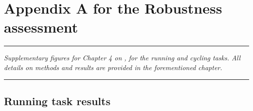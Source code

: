 
\appendix
\renewcommand\chaptername{Appendix~}

\lhead[\fancyplain{}{\leftmark}]%
      {\fancyplain{}{}} %
\chead[\fancyplain{}{}]%
      {\fancyplain{}{}}
\rhead[\fancyplain{}{}]%
      {\fancyplain{}{\rightmark}}%
\lfoot[\fancyplain{}{}]%
      {\fancyplain{}{}}
\cfoot[\fancyplain{}{\thepage}]%
      {\fancyplain{}{\thepage}} %
\rfoot[\fancyplain{}{}]%
     {\fancyplain{}{\scriptsize}}



\chapter{Appendix A for the Robustness assessment}
\label{Ann:1}


\begin{center}
\rule{0.7\linewidth}{.5pt}
\begin{minipage}{0.7\linewidth}
\smallskip

\textit{
Supplementary figures for Chapter 4 on , for the running and cycling tasks. \newline\newline All details on methods and results are provided in the forementioned chapter.
}

\end{minipage}
\smallskip
\rule{0.7\linewidth}{.5pt}
\end{center}

\minitoc
\newpage

\section{Running task results}

